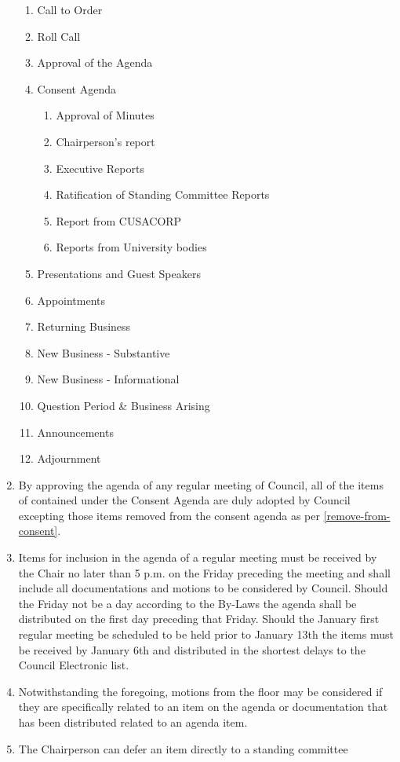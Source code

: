 \documentclass[oneside]{book}
\begin{document}
\begin{enumerate}
\begin{enumerate}
\item Call to Order 
\item Roll Call
\item Approval of the Agenda
\item Consent Agenda 
\begin{enumerate}
\item Approval of Minutes 
\item Chairperson's report
\item Executive Reports 
\item Ratification of Standing Committee Reports
\item Report from CUSACORP 
\item Reports from University bodies
\end{enumerate}
\item Presentations and Guest Speakers 
\item Appointments
\item Returning Business
\item New Business - Substantive
\item New Business - Informational
\item Question Period & Business Arising
\item Announcements 
\item Adjournment 
\end{enumerate}
\item By approving the agenda of any regular meeting of Council, all of the 
items of contained under the Consent Agenda are duly adopted by Council excepting 
those items removed from the consent agenda as per \autoref{remove-from-consent}.
\item Items for inclusion in the agenda of a regular meeting must be received
by the Chair no later than 5 p.m. on the Friday preceding the meeting and shall include
all documentations and motions to be considered by Council. Should the Friday not be a day 
according to the By-Laws the agenda shall be distributed on the first day preceding that Friday. 
Should the January first regular meeting be scheduled to be held prior to January 13th
the items must be received by January 6th and distributed in the shortest delays to the 
Council Electronic list. 
\item Notwithstanding the foregoing, motions from the floor may be considered if they are
specifically related to an item on the agenda or documentation that
has been distributed related to an agenda item.
\item The Chairperson can defer an item directly to a standing committee

\end{enumerate}
\end{document}
